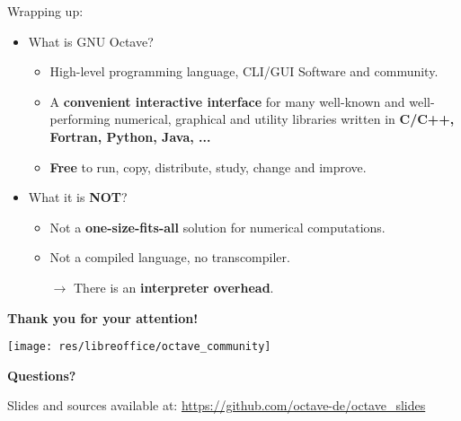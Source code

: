 \begin{frame}{Wrapping up:}
\begin{itemize}
\itemsep2em
\item
What is GNU Octave?
\begin{itemize}
\itemsep1em
\item
High-level programming language, CLI/GUI Software and community.

\item
A \textbf{convenient interactive interface}
for many well-known and well-performing
numerical, graphical and utility libraries
written in \textbf{C/C++, Fortran, Python, Java, ...}

\item
\textbf{Free} to run, copy, distribute, study, change and improve.
\end{itemize}

\item
What it is \textbf{NOT}?
\begin{itemize}
\itemsep1em
\item
Not a \textbf{one-size-fits-all} solution for numerical computations.

\item
Not a compiled language, no transcompiler.

$\rightarrow$ There is an \textbf{interpreter overhead}.
\end{itemize}
\end{itemize}
\end{frame}



\begin{frame}
\begin{center}
\textbf{\Large Thank you for your attention!}\bigskip

\texttt{[image: res/libreoffice/octave\_community]}

\textbf{\Large Questions?}
\end{center}
\vfill\footnotesize
Slides and sources available at:
{\color{DarkBlue}\url{https://github.com/octave-de/octave_slides}}
\end{frame}
